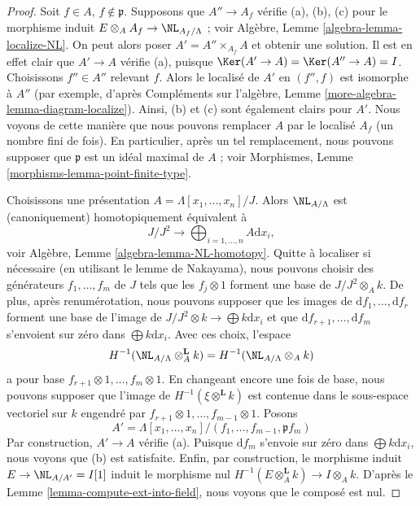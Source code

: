 \begin{proof}
Soit $f \in A$, $f \not \in \mathfrak p$. Supposons que $A'' \to A_f$
vérifie (a), (b), (c) pour le morphisme induit
$E \otimes_A A_f \to \NL_{A_f/\Lambda}$ ; voir
Algèbre, Lemme \ref{algebra-lemma-localize-NL}.
On peut alors poser $A' = A'' \times_{A_f} A$ et obtenir une solution.
Il est en effet clair que $A' \to A$ vérifie (a), puisque
$\Ker(A' \to A) = \Ker(A'' \to A) = I$. Choisissons
$f'' \in A''$ relevant $f$. Alors le localisé de $A'$ en
$(f'', f)$ est isomorphe à $A''$
(par exemple, d'après
Compléments sur l'algèbre, Lemme \ref{more-algebra-lemma-diagram-localize}).
Ainsi, (b) et (c) sont également clairs pour $A'$.
Nous voyons de cette manière que nous pouvons remplacer $A$ par le localisé
$A_f$ (un nombre fini de fois).
En particulier, après un tel remplacement, nous pouvons supposer que $\mathfrak p$
est un idéal maximal de $A$ ; voir
Morphismes, Lemme \ref{morphisms-lemma-point-finite-type}.

\medskip\noindent
Choisissons une présentation $A = \Lambda[x_1, \ldots, x_n]/J$. Alors
$\NL_{A/\Lambda}$ est (canoniquement) homotopiquement équivalent à
$$
J/J^2
\longrightarrow
\bigoplus\nolimits_{i = 1, \ldots, n} A\text{d}x_i,
$$
voir Algèbre, Lemme \ref{algebra-lemma-NL-homotopy}. Quitte à localiser
si nécessaire (en utilisant le lemme de Nakayama), nous pouvons choisir des générateurs
$f_1, \ldots, f_m$ de $J$ tels que les $f_j \otimes 1$ forment une base de
$J/J^2 \otimes_A k$. De plus, après renumérotation, nous pouvons supposer que les
images de $\text{d}f_1, \ldots, \text{d}f_r$ forment une
base de l'image de $J/J^2 \otimes k \to \bigoplus k\text{d}x_i$
et que $\text{d}f_{r + 1}, \ldots, \text{d}f_m$ s'envoient sur zéro dans
$\bigoplus k\text{d}x_i$. Avec ces choix, l'espace
$$
H^{-1}(\NL_{A/\Lambda} \otimes^{\mathbf{L}}_A k) =
H^{-1}(\NL_{A/\Lambda} \otimes_A k)
$$
a pour base $f_{r + 1} \otimes 1, \ldots, f_m \otimes 1$. En changeant
encore une fois de base, nous pouvons supposer que l'image de $H^{-1}(\xi \otimes^{\mathbf{L}} k)$
est contenue dans le sous-espace vectoriel sur $k$ engendré par
$f_{r + 1} \otimes 1, \ldots, f_{m - 1} \otimes 1$.
Posons
$$
A' = \Lambda[x_1, \ldots, x_n]/(f_1, \ldots, f_{m - 1}, \mathfrak pf_m)
$$
Par construction, $A' \to A$ vérifie (a). Puisque $\text{d}f_m$ s'envoie
sur zéro dans $\bigoplus k\text{d}x_i$, nous voyons que (b) est satisfaite. Enfin, par
construction, le morphisme induit $E \to \NL_{A/A'} = I[1]$ induit le morphisme nul
$H^{-1}(E \otimes_A^\mathbf{L} k) \to I \otimes_A k$. D'après le
Lemme \ref{lemma-compute-ext-into-field},
nous voyons que le composé est nul.
\end{proof}

